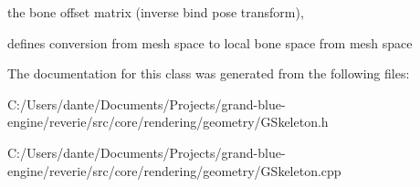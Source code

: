 the bone offset matrix (inverse bind pose transform), 

defines conversion from mesh space to local bone space from mesh space 

The documentation for this class was generated from the following files\+:\begin{DoxyCompactItemize}
\item 
C\+:/\+Users/dante/\+Documents/\+Projects/grand-\/blue-\/engine/reverie/src/core/rendering/geometry/G\+Skeleton.\+h\item 
C\+:/\+Users/dante/\+Documents/\+Projects/grand-\/blue-\/engine/reverie/src/core/rendering/geometry/G\+Skeleton.\+cpp\end{DoxyCompactItemize}
